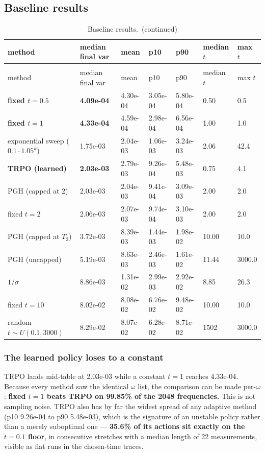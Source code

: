 \documentclass[12pt,a4paper]{article}
\begin{document}
\subsection{Baseline results}\label{sec:baseline-results}
\begin{center}
\footnotesize
\begin{longtable}{lllllll}
\caption{Baseline results.}\label{tab:baseline-results}\\
\toprule
method & median final var & mean & p10 & p90 & median $t$ & max $t$ \\
\midrule
\endfirsthead
\caption[]{Baseline results.\ (continued)}\\
\toprule
method & median final var & mean & p10 & p90 & median $t$ & max $t$ \\
\midrule
\endhead
\bottomrule
\endfoot
\textbf{fixed $t = 0.5$} & \textbf{4.09e-04} & 4.30e-04 & 3.05e-04 & 5.80e-04 & 0.50 & 0.5 \\
\textbf{fixed $t = 1$} & \textbf{4.33e-04} & 4.59e-04 & 2.98e-04 & 6.56e-04 & 1.00 & 1.0 \\
exponential sweep ($0.1 \cdot 1.05^k$) & 1.75e-03 & 2.04e-03 & 1.06e-03 & 3.24e-03 & 2.06 & 42.4 \\
\textbf{TRPO (learned)} & \textbf{2.03e-03} & 2.79e-03 & 9.26e-04 & 5.48e-03 & 0.75 & 4.1 \\
PGH (capped at 2) & 2.03e-03 & 2.04e-03 & 9.41e-04 & 3.09e-03 & 2.00 & 2.0 \\
fixed $t = 2$ & 2.06e-03 & 2.07e-03 & 9.74e-04 & 3.10e-03 & 2.00 & 2.0 \\
PGH (capped at $T_2$) & 3.72e-03 & 8.39e-03 & 1.44e-03 & 1.98e-02 & 10.00 & 10.0 \\
PGH (uncapped) & 5.19e-03 & 8.63e-03 & 2.46e-03 & 1.61e-02 & 11.44 & 3000.0 \\
$1/\sigma$ & 8.86e-03 & 1.31e-02 & 2.99e-03 & 2.92e-02 & 8.85 & 26.3 \\
fixed $t = 10$ & 8.02e-02 & 8.08e-02 & 6.76e-02 & 9.48e-02 & 10.00 & 10.0 \\
random $t \sim U(0.1, 3000)$ & 8.29e-02 & 8.07e-02 & 6.28e-02 & 8.71e-02 & 1502 & 3000.0 \\
\end{longtable}
\end{center}

\subsubsection{The learned policy loses to a constant}\label{sec:what-this-says}
TRPO lands mid-table at 2.03e-03 while a constant $t = 1$ reaches 4.33e-04. Because every method saw the identical $\omega$ list, the comparison can be made per-$\omega$: \textbf{fixed $t = 1$ beats TRPO on 99.85\% of the 2048 frequencies.} This is not sampling noise. TRPO also has by far the widest spread of any adaptive method (p10 9.26e-04 to p90 5.48e-03), which is the signature of an unstable policy rather than a merely suboptimal one --- \textbf{35.6\% of its actions sit exactly on the $t = 0.1$ floor}, in consecutive stretches with a median length of 22 measurements, visible as flat runs in the chosen-time traces.
\end{document}
